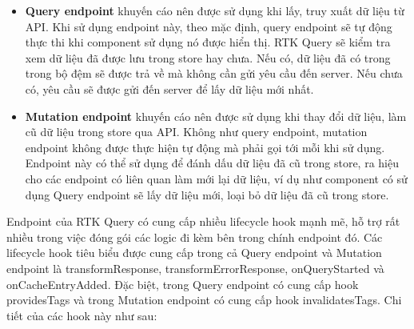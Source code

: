 \begin{itemize}
  \item \textbf{Query endpoint} khuyến cáo nên được sử dụng khi lấy, truy xuất dữ liệu từ API.
  Khi sử dụng endpoint này, theo mặc định, query endpoint sẽ tự động thực thi khi component sử dụng nó được hiển thị.
  RTK Query sẽ kiểm tra xem dữ liệu đã được lưu trong store hay chưa.
  Nếu có, dữ liệu đã có trong trong bộ đệm sẽ được trả về mà không cần gửi yêu cầu đến server.
  Nếu chưa có, yêu cầu sẽ được gửi đến server để lấy dữ liệu mới nhất.
  \item \textbf{Mutation endpoint} khuyến cáo nên được sử dụng khi thay đổi dữ liệu, làm cũ dữ liệu trong store qua API.
  Không như query endpoint, mutation endpoint không được thực hiện tự động mà phải gọi tới mỗi khi sử dụng.
  Endpoint này có thể sử dụng để đánh dấu dữ liệu đã cũ trong store, ra hiệu cho các endpoint có liên quan làm mới lại dữ liệu, ví dụ như component có sử dụng Query endpoint sẽ lấy dữ liệu mới, loại bỏ dữ liệu đã cũ trong store.
\end{itemize}

Endpoint của RTK Query có cung cấp nhiều lifecycle hook mạnh mẽ, hỗ trợ rất nhiều trong việc đóng gói các logic đi kèm bên trong chính endpoint đó.
Các lifecycle hook tiêu biểu được cung cấp trong cả Query endpoint và Mutation endpoint là transformResponse,  transformErrorResponse, onQueryStarted và onCacheEntryAdded.
Đặc biệt, trong Query endpoint có cung cấp hook providesTags và trong Mutation endpoint có cung cấp hook invalidatesTags.
Chi tiết của các hook này như sau:


